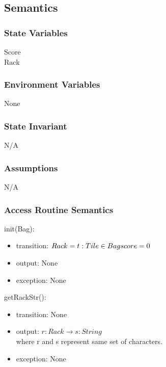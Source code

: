 \documentclass[12pt]{article}
\begin{document}
\subsection* {Semantics}

\subsubsection* {State Variables}

Score \\
Rack

\subsubsection* {Environment Variables}
None
\subsubsection* {State Invariant}

N/A

\subsubsection* {Assumptions}

N/A

\begin{itemize}

\end{itemize}

\subsubsection* {Access Routine Semantics}

\noindent init(Bag):
\begin{itemize}
\item transition: $Rack = {t : Tile \in Bag}\\
score = 0$
\item output: None
\item exception: None
\end{itemize}

\noindent getRackStr():
\begin{itemize}
\item transition: None
\item output: $r:Rack \rightarrow s:String$ \\
where r and s represent same set of characters.
\item exception: None
\end{itemize}
\end{document}
